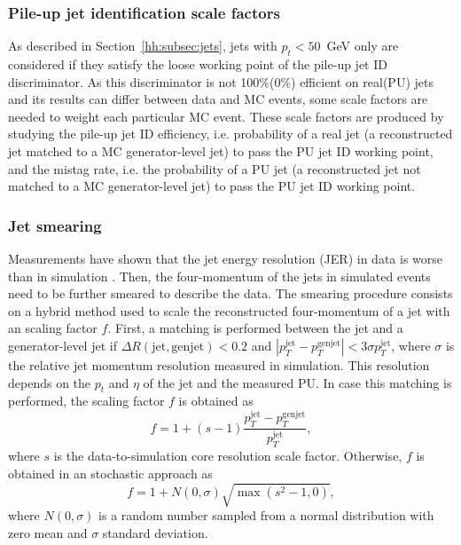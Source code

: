 \documentclass[../main.tex]{subfiles}
\begin{document}
\subsubsection*{Pile-up jet identification scale factors}

As described in Section~\ref{hh:subsec:jets}, jets with $p_t < 50$~GeV only are considered if they satisfy the loose working point of the pile-up jet ID discriminator. As this discriminator is not 100\%(0\%) efficient on real(PU) jets and its results can differ between data and MC events, some scale factors are needed to weight each particular MC event. These scale factors are produced by studying the pile-up jet ID efficiency, i.e. probability of a real jet (a reconstructed jet matched to a MC generator-level jet) to pass the PU jet ID working point, and the mistag rate, i.e. the probability of a PU jet (a reconstructed jet not matched to a MC generator-level jet) to pass the PU jet ID working point.

\subsubsection*{Jet smearing}

Measurements have shown that the jet energy resolution (JER) in data is worse than in simulation \cite{hh:corr:smearing_8TeV}. Then, the four-momentum of the jets in simulated events need to be further smeared to describe the data. The smearing procedure consists on a hybrid method used to scale the reconstructed four-momentum of a jet with an scaling factor $f$. First, a matching is performed between the jet and a generator-level jet if $\Delta R(\text{jet}, \text{genjet})<0.2$ and $|p_T^{\text{jet}} - p_T^{\text{genjet}}| < 3\sigma p_T^{\text{jet}}$, where $\sigma$ is the relative jet momentum resolution measured in simulation. This resolution depends on the $p_t$ and $\eta$ of the jet and the measured PU. In case this matching is performed, the scaling factor $f$ is obtained as
\begin{equation}
f = 1 + (s - 1)\frac{p_T^\text{jet} - p_T^\text{genjet}}{p_T^\text{jet}},
\end{equation}
where $s$ is the data-to-simulation core resolution scale factor. Otherwise, $f$ is obtained in an stochastic approach as
\begin{equation}
f = 1 + N(0, \sigma)\sqrt{\max(s^2-1, 0)},
\end{equation}
where $N(0, \sigma)$ is a random number sampled from a normal distribution with zero mean and $\sigma$ standard deviation.
\end{document}
